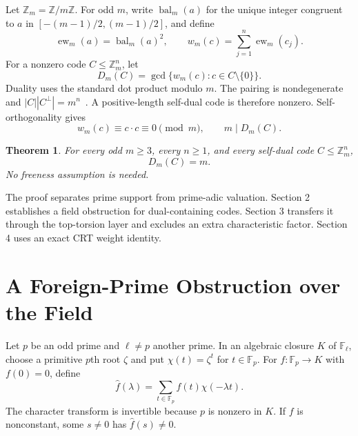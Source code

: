 \documentclass[12pt,letterpaper,onecolumn]{article}
\newtheorem{theorem}{Theorem}[section]
\newcommand{\Z}{\mathbb{Z}}
\newcommand{\F}{\mathbb{F}}
\newcommand{\bal}{\operatorname{bal}}
\newcommand{\ew}{\operatorname{ew}}
\begin{document}
Let $\Z_m=\Z/m\Z$. For odd $m$, write $\bal_m(a)$ for the unique integer congruent to $a$ in $[-(m-1)/2,(m-1)/2]$, and define
\begin{equation}
 \ew_m(a)=\bal_m(a)^2,\qquad w_m(c)=\sum_{j=1}^n\ew_m(c_j).
 \label{eq:weights}
\end{equation}
For a nonzero code $C\le\Z_m^n$, let
\begin{equation}
 D_m(C)=\gcd\{w_m(c):c\in C\setminus\{0\}\}.
 \label{eq:gcd}
\end{equation}
Duality uses the standard dot product modulo $m$. The pairing is nondegenerate and $|C||C^\perp|=m^n$~\cite{DoughertyHaradaSole1999}. A positive-length self-dual code is therefore nonzero. Self-orthogonality gives
\begin{equation}
 w_m(c)\equiv c\cdot c\equiv0\pmod m,
 \qquad m\mid D_m(C).
 \label{eq:baseline}
\end{equation}

\begin{theorem}\label{thm:main}
For every odd $m\ge3$, every $n\ge1$, and every self-dual code $C\le\Z_m^n$,
\begin{equation}
 D_m(C)=m.
 \label{eq:main}
\end{equation}
No freeness assumption is needed.
\end{theorem}

The proof separates prime support from prime-adic valuation. Section 2 establishes a field obstruction for dual-containing codes. Section 3 transfers it through the top-torsion layer and excludes an extra characteristic factor. Section 4 uses an exact CRT weight identity.

\section{A Foreign-Prime Obstruction over the Field}
Let $p$ be an odd prime and $\ell\ne p$ another prime. In an algebraic closure $K$ of $\F_\ell$, choose a primitive $p$th root $\zeta$ and put $\chi(t)=\zeta^t$ for $t\in\F_p$. For $f:\F_p\to K$ with $f(0)=0$, define
\begin{equation}
 \widehat f(\lambda)=\sum_{t\in\F_p}f(t)\chi(-\lambda t).
 \label{eq:transform}
\end{equation}
The character transform is invertible because $p$ is nonzero in $K$. If $f$ is nonconstant, some $s\ne0$ has $\widehat f(s)\ne0$.
\end{document}
